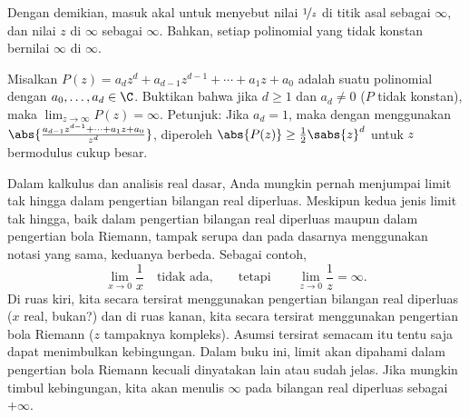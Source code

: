 
Dengan demikian, masuk akal untuk menyebut nilai $\nicefrac{1}{z}$ di titik asal
sebagai $\infty$, dan nilai $z$ di $\infty$ sebagai $\infty$.
Bahkan, setiap polinomial yang tidak konstan bernilai $\infty$ di $\infty$.

\begin{exbox}
\begin{exercise}%
\label{exercise:polygoesinf}
Misalkan $P(z) = a_d z^d + a_{d-1} z^{d-1} + \cdots + a_1 z + a_0$ adalah
suatu polinomial dengan $a_0,\ldots,a_d \in \C$.  Buktikan bahwa jika $d \geq 1$
dan $a_d \neq 0$ ($P$ tidak konstan),
maka $\lim_{z \to \infty} P(z) = \infty$.
Petunjuk: Jika $a_d = 1$, maka dengan menggunakan
$\abs{\frac{a_{d-1} z^{d-1} + \cdots + a_1 z + a_0}{z^d}}$, diperoleh
$\abs{P(z)} \geq \frac{1}{2} \sabs{z}^d$ untuk $z$ bermodulus cukup besar.
\end{exercise}
\end{exbox}

Dalam kalkulus dan analisis real dasar, Anda mungkin pernah menjumpai
limit tak hingga dalam pengertian bilangan real diperluas.
Meskipun kedua jenis limit tak hingga, baik dalam pengertian
bilangan real diperluas maupun dalam pengertian bola Riemann,
tampak serupa dan pada dasarnya menggunakan notasi yang sama,
keduanya berbeda.
Sebagai contoh,
\begin{equation*}
\lim_{x \to 0} \frac{1}{x} \quad \text{tidak ada,} \qquad \text{tetapi} \qquad
\lim_{z \to 0} \frac{1}{z} = \infty .
\end{equation*}
Di ruas kiri, kita secara tersirat menggunakan pengertian bilangan real diperluas
($x$ real, bukan?) dan di
ruas kanan, kita secara tersirat menggunakan pengertian bola Riemann ($z$ tampaknya kompleks).
Asumsi tersirat semacam itu tentu saja dapat menimbulkan kebingungan.
Dalam buku ini, limit akan dipahami dalam pengertian bola Riemann
kecuali dinyatakan lain atau sudah jelas.
Jika mungkin timbul kebingungan, kita akan menulis $\infty$ pada bilangan real diperluas
sebagai $+\infty$.

\medskip

